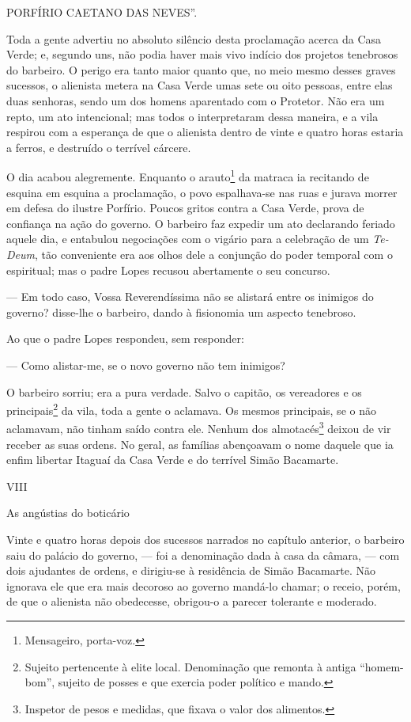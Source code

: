 PORFÍRIO CAETANO DAS NEVES''.

Toda a gente advertiu no absoluto silêncio desta proclamação acerca da
Casa Verde; e, segundo uns, não podia haver mais vivo indício dos
projetos tenebrosos do barbeiro. O perigo era tanto maior quanto que, no
meio mesmo desses graves sucessos, o alienista metera na Casa Verde umas
sete ou oito pessoas, entre elas duas senhoras, sendo um dos homens
aparentado com o Protetor. Não era um repto, um ato intencional; mas
todos o interpretaram dessa maneira, e a vila respirou com a esperança
de que o alienista dentro de vinte e quatro horas estaria a ferros, e
destruído o terrível cárcere.

O dia acabou alegremente. Enquanto o arauto\footnote{Mensageiro,
  porta-voz.} da matraca ia recitando de esquina em esquina a
proclamação, o povo espalhava-se nas ruas e jurava morrer em defesa do
ilustre Porfírio. Poucos gritos contra a Casa Verde, prova de confiança
na ação do governo. O barbeiro faz expedir um ato declarando feriado
aquele dia, e entabulou negociações com o vigário para a celebração de
um \emph{Te-Deum}, tão conveniente era aos olhos dele a conjunção do
poder temporal com o espiritual; mas o padre Lopes recusou abertamente o
seu concurso.

--- Em todo caso, Vossa Reverendíssima não se alistará entre os inimigos
do governo? disse-lhe o barbeiro, dando à fisionomia um aspecto
tenebroso.

Ao que o padre Lopes respondeu, sem responder:

--- Como alistar-me, se o novo governo não tem inimigos?

O barbeiro sorriu; era a pura verdade. Salvo o capitão, os vereadores e
os principais\footnote{Sujeito pertencente à elite local. Denominação
  que remonta à antiga ``homem-bom'', sujeito de posses e que exercia
  poder político e mando.} da vila, toda a gente o aclamava. Os mesmos
principais, se o não aclamavam, não tinham saído contra ele. Nenhum dos
almotacés\footnote{Inspetor de pesos e medidas, que fixava o valor dos
  alimentos.} deixou de vir receber as suas ordens. No geral, as
famílias abençoavam o nome daquele que ia enfim libertar Itaguaí da Casa
Verde e do terrível Simão Bacamarte.

VIII

As angústias do boticário

Vinte e quatro horas depois dos sucessos narrados no capítulo anterior,
o barbeiro saiu do palácio do governo, --- foi a denominação dada à casa
da câmara, --- com dois ajudantes de ordens, e dirigiu-se à residência
de Simão Bacamarte. Não ignorava ele que era mais decoroso ao governo
mandá-lo chamar; o receio, porém, de que o alienista não obedecesse,
obrigou-o a parecer tolerante e moderado.

